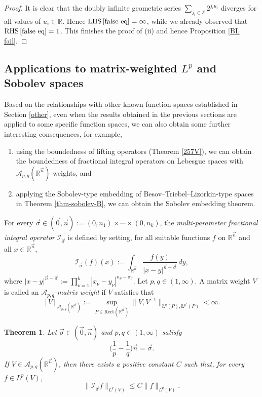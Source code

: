\documentclass[11pt, reqno]{amsart}
\newtheorem{theorem}{Theorem}[section]
\theoremstyle{definition}
\theoremstyle{remark}
\numberwithin{equation}{section}
\newcommand{\A}{\mathscr A}
\newcommand{\R}{\mathbb R}
\newcommand{\Z}{\mathbb Z}
\newcommand{\vn}{\vec n}
\newcommand{\aveL}{\textit{\L}}
\newcommand{\Rect}{\mathrm{Rect}}
\begin{document}
\begin{proof}
It is clear that the doubly infinite geometric series $\sum_{j_i\in\Z}2^{j_i u_i}$ diverges for all values of $u_i\in\R$. Hence $\operatorname{LHS}\eqref{false eq}=\infty$, while we already observed that $\operatorname{RHS}\eqref{false eq}=1$.
This finishes the proof of (ii) and hence Proposition \ref{BL fail}.
\end{proof}

\subsection{Applications to matrix-weighted $L^p$ and Sobolev spaces} \label{sec:lift}

Based on the relationships with other known function spaces
established in Section \ref{other}, even when the results obtained in the previous
sections are applied to some specific function spaces, we can also
obtain some further interesting consequences, for example,
\begin{enumerate}[\rm(i)]
\item using the boundedness of lifting operators (Theorem \ref{257V}),
we can obtain the boundedness of fractional integral operators on
Lebesgue spaces with $\A_{p,q}(\mathbb R^{\vec n})$ weights, and

\item applying the Sobolev-type embedding of Besov--Triebel--Lizorkin-type spaces in Theorem \ref{thm-sobolev-B}, we can obtain the Sobolev embedding theorem.
\end{enumerate}

For every $\vec\sigma\in (\vec 0,\vec n):=(0,n_1)\times\cdots\times(0,n_k)$,
the \emph{multi-parameter fractional integral operator} $\mathscr I_{\vec\sigma}$
is defined by setting, for all suitable functions $f$ on $\R^{\vn}$ and all $x\in\mathbb R^{\vec n}$,
$$
\mathscr I_{\vec\sigma}(f)(x)
:=\int_{\mathbb R^{\vec n}} \frac{f(y)}{|x-y|^{\vec n-\vec\sigma}}\,dy,
$$
where $|x-y|^{\vec n-\vec\sigma}:=\prod_{\nu=1}^k|x_\nu-y_\nu|^{n_\nu-\sigma_\nu}$.
Let $p,q\in(1,\infty)$. A matrix weight $V$ is called
an \emph{$\A_{p,q}$-matrix weight} if $V$ satisfies that
$$
[V]_{\A_{p,q}(\mathbb R^{\vec n})}:=\sup_{P\in\Rect(\mathbb R^{\vec n})}
\|V,V^{-1}\|_{\aveL^{q}(P),\aveL^{p'}(P)}<\infty.
$$

\begin{theorem} \label{fractional}
Let $\vec\sigma\in (\vec 0,\vec n)$ and $p,q\in(1,\infty)$ satisfy
\begin{equation}\label{sharp condition}
\big(\frac 1p-\frac 1q\big) \vec n=\vec \sigma.
\end{equation}
If $V\in \A_{p,q}(\R^{\vn})$, then there exists
a positive constant $C$ such that, for every $f\in L^p(V)$,
\begin{equation}\label{boundedness}
\|\mathscr I_{\vec\sigma} f\|_{L^q(V)}
\leq C \|f\|_{L^p(V)}.
\end{equation}
\end{theorem}
\end{document}
